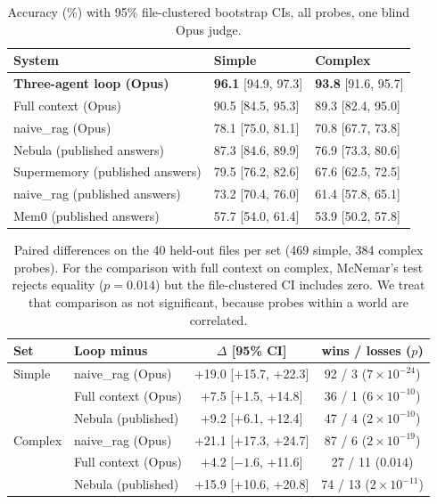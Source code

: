\documentclass[11pt]{article}
\begin{document}
\begin{table}[t]
\centering\small
\begin{tabular}{lll}
\toprule
System & Simple & Complex\\
\midrule
\textbf{Three-agent loop (Opus)} & \textbf{96.1} [94.9, 97.3] & \textbf{93.8} [91.6, 95.7]\\
Full context (Opus) & 90.5 [84.5, 95.3] & 89.3 [82.4, 95.0]\\
naive\_rag (Opus) & 78.1 [75.0, 81.1] & 70.8 [67.7, 73.8]\\
\midrule
Nebula (published answers) & 87.3 [84.6, 89.9] & 76.9 [73.3, 80.6]\\
Supermemory (published answers) & 79.5 [76.2, 82.6] & 67.6 [62.5, 72.5]\\
naive\_rag (published answers) & 73.2 [70.4, 76.0] & 61.4 [57.8, 65.1]\\
Mem0 (published answers) & 57.7 [54.0, 61.4] & 53.9 [50.2, 57.8]\\
\bottomrule
\end{tabular}
\caption{Accuracy (\%) with 95\% file-clustered bootstrap CIs, all probes, one blind Opus judge.}
\label{tab:main}
\end{table}

\begin{table}[t]
\centering\small
\begin{tabular}{llcc}
\toprule
Set & Loop minus & $\Delta$ [95\% CI] & wins / losses ($p$)\\
\midrule
Simple & naive\_rag (Opus) & +19.0 [+15.7, +22.3] & 92 / 3 ($7\times10^{-24}$)\\
 & Full context (Opus) & +7.5 [+1.5, +14.8] & 36 / 1 ($6\times10^{-10}$)\\
 & Nebula (published) & +9.2 [+6.1, +12.4] & 47 / 4 ($2\times10^{-10}$)\\
\midrule
Complex & naive\_rag (Opus) & +21.1 [+17.3, +24.7] & 87 / 6 ($2\times10^{-19}$)\\
 & Full context (Opus) & +4.2 [$-1.6$, +11.6] & 27 / 11 ($0.014$)\\
 & Nebula (published) & +15.9 [+10.6, +20.8] & 74 / 13 ($2\times10^{-11}$)\\
\bottomrule
\end{tabular}
\caption{Paired differences on the 40 held-out files per set (469 simple, 384 complex probes). For the comparison with full context on complex, McNemar's test rejects equality ($p=0.014$) but the file-clustered CI includes zero. We treat that comparison as not significant, because probes within a world are correlated.}
\label{tab:paired}
\end{table}
\end{document}
